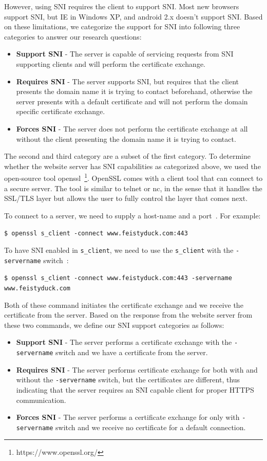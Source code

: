 \documentclass{acm_proc_article-sp}
\begin{document}
However, using SNI requires the client to support SNI. Most new browsers support SNI, but IE in Windows XP, and android 2.x doesn't support SNI. Based on these limitations, we categorize the support for SNI into following three categories to answer our research questions:
\begin{itemize}
\item \textbf{Support SNI} - The server is capable of servicing requests from SNI supporting clients and will perform the certificate exchange.
\item \textbf{Requires SNI} - The server supports SNI, but requires that the client presents the domain name it is trying to contact beforehand, otherwise the server presents with a default certificate and will not perform the domain specific certificate exchange.
\item \textbf{Forces SNI} - The server does not perform the certificate exchange at all without the client presenting the domain name it is trying to contact.
\end{itemize}

The second and third category are a subset of the first category. To determine whether the website server has SNI capabilities as categorized above, we used the open-source tool openssl~\footnote{https://www.openssl.org/}. OpenSSL comes with a client tool that can connect to a secure server. The tool is similar to telnet or nc, in the sense that it handles the SSL/TLS layer but allows the user to fully control the layer that comes next.

To connect to a server, we need to supply a host-name and a port~\cite{ristic2013openssl}. For example:

\texttt{\$ openssl s\_client -connect www.feistyduck.com:443}

To have SNI enabled in \texttt{s\_client}, we need to use the \texttt{s\_client} with the \texttt{-servername} switch~\cite{ristic2013openssl}:

\texttt{\$ openssl s\_client -connect www.feistyduck.com:443 -servername www.feistyduck.com}

Both of these command initiates the certificate exchange and we receive the certificate from the server. Based on the response from the website server from these two commands, we define our SNI support categories as follows:
\begin{itemize}
\item \textbf{Support SNI} - The server performs a certificate exchange with the \texttt{-servername} switch and we have a certificate from the server.
\item \textbf{Requires SNI} - The server performs certificate exchange for both with and without the \texttt{-servername} switch, but the certificates are different, thus indicating that the server requires an SNI capable client for proper HTTPS communication.
\item \textbf{Forces SNI} - The server performs a certificate exchange for only with \texttt{-servername} switch and we receive no certificate for a default connection.
\end{itemize}
\end{document}
